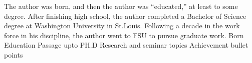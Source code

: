 \documentclass[11pt,expanded,copyright]{fsuthesis}
\begin{document}


\printbibliography





%


\begin{biosketch}
The author was born, and then the author was ``educated,'' at least to
some degree.  After finishing high school, the author
completed a Bachelor of Science degree at Washington University in St.Louis.
Following a decade in the work force in his discipline, the author
went to FSU to pursue graduate work.
Born Education Passage upto PH.D
Research and seminar topics
Achievement bullet points
\end{biosketch}

\end{document}
